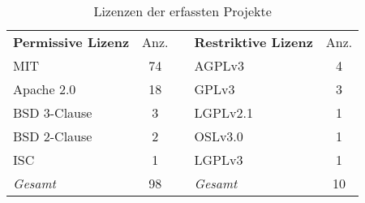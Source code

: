 \begin{table}[h]
    \begin{tabular}{lcllc}
        \cline{1-2} \cline{4-5}
        \textbf{Permissive Lizenz} & \multicolumn{1}{l}{Anz.} & \hspace{2cm} & \textbf{Restriktive Lizenz} & \multicolumn{1}{l}{Anz.} \\ \cline{1-2} \cline{4-5}
        MIT                        & 74                       &              & AGPLv3                      & 4                        \\
        Apache 2.0                 & 18                       &              & GPLv3                       & 3                        \\
        BSD 3-Clause               & 3                        &              & LGPLv2.1                    & 1                        \\
        BSD 2-Clause               & 2                        &              & OSLv3.0                     & 1                        \\
        ISC                        & 1                        &              & LGPLv3                      & 1                        \\ \cline{1-2} \cline{4-5}
        \textit{Gesamt}            & 98                       &              & \textit{Gesamt}             & 10
    \end{tabular}%
    \caption{Lizenzen der erfassten Projekte}
    \label{tab:lizenzen}
\end{table}